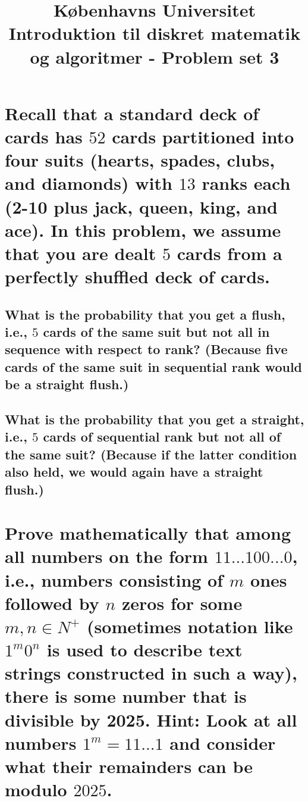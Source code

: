 \documentclass[a4paper,12pt]{article}
\begin{document}
% 

\title{Københavns Universitet\\
Introduktion til diskret matematik og algoritmer - Problem set 3}
\maketitle %


\section[Question 1]{Recall that a standard deck of cards has $52$ cards partitioned into four suits (hearts,
spades, clubs, and diamonds) with $13$ ranks each (2-10 plus jack, queen, king, and ace). In this
problem, we assume that you are dealt $5$ cards from a perfectly shuffled deck of cards.}

\subsection[]{What is the probability that you get a flush, i.e., $5$ cards of the same suit but not all in
sequence with respect to rank? (Because five cards of the same suit in sequential rank
would be a straight flush.)}



\subsection[]{What is the probability that you get a straight, i.e., $5$ 
cards of sequential rank but not all of the same suit? (Because if the latter condition also held, 
we would again have a straight flush.)
}



\section[Question 2]{Prove mathematically that among all numbers on the form $11...100...0$, i.e., numbers
consisting of $m$ ones followed by $n$ zeros for some $m,n \in N^+$ (sometimes notation like $1^m0^n$ is
used to describe text strings constructed in such a way), there is some number that is divisible
by 2025. Hint: Look at all numbers $1^m = 11 ... 1$ and consider what their remainders can be modulo $2025$.}
\end{document}
